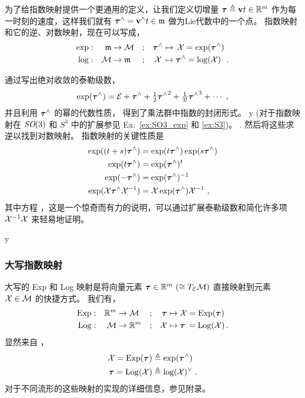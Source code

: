 为了给指数映射提供一个更通用的定义，让我们定义切增量 ${\bm \tau}\triangleq{\bf v} t\in{\mathbb R}^m$ 作为每一时刻的速度，这样我们就有 ${\bm \tau}^\wedge={\bf v}^\wedge t\in\frak{m}$ 做为Lie代数中的一个点。
指数映射和它的逆、对数映射，现在可以写成，
%
\begin{align}
\exp &:& \frak{m} & \to\mathcal{M}      
 &&; & {\bm \tau}^\wedge &\mapsto \,\mathcal{X} = \exp({\bm \tau}^\wedge) 
 \\
\log &:&     \mathcal{M} & \to\frak{m} 
 &&; & \mathcal{X}\,    &\mapsto {\bm \tau}^\wedge = \log(\mathcal{X}) ~
~. 
\end{align}


通过写出绝对收敛的泰勒级数，
%
\begin{align}
\exp({\bm \tau}^\wedge)=\mathcal{E}+{\bm \tau}^\wedge+\tfrac12{{\bm \tau}^\wedge}^2+\tfrac1{3!}{{\bm \tau}^\wedge}^3+\cdots
~,
\end{align}
%
并且利用 ${\bm \tau}^\wedge$ 的幂的代数性质，%
得到了乘法群中指数的封闭形式。
\if \examples y (对于指数映射在 $\textit{SO}(3)$ 和 $S^3$ 中的扩展参见 Ex.~\ref{ex:SO3_exp} 和 \ref{ex:S3})。 \else. \fi
然后将这些求逆以找到对数映射。
%
指数映射的关键性质是 
%
\begin{align}
\exp((t+s){\bm \tau}^\wedge) 
 &= \exp(t{\bm \tau}^\wedge)\exp(s{\bm \tau}^\wedge) \label{equ:prop_exp_ts}
 \\
\exp(t{\bm \tau}^\wedge) 
 &= \exp({\bm \tau}^\wedge)^t \label{equ:prop_exp_t}
 \\
\exp(-{\bm \tau}^\wedge) 
 &= \exp({\bm \tau}^\wedge)^{-1} \label{equ:prop_exp_inv}
 \\
\exp(\mathcal{X}{\bm \tau}^\wedge\mathcal{X}^{-1}) 
 &= \mathcal{X}\exp({\bm \tau}^\wedge)\mathcal{X}^{-1} ~, \label{equ:prop_exp}
\end{align} 
%
其中方程 ，这是一个惊奇而有力的说明，可以通过扩展泰勒级数和简化许多项 $\mathcal{X}^{-1}\mathcal{X}$ 来轻易地证明。

\if\examples y

\fi



\subsubsection[The capitalized Exp map]{大写指数映射}


大写的 Exp 和 Log 映射是将向量元素 ${\bm \tau}\in{\mathbb R}^m~(\cong T_{\mathcal{E}}{\mathcal{M}})$ 直接映射到元素 $\mathcal{X}\in\mathcal{M}$ 的快捷方式。
% 
我们有，
%
\begin{align}
\operatorname*{Exp} &: &{\mathbb R}^m &\to\mathcal{M} &&;&
\,{\bm \tau} &\mapsto \mathcal{X} = \operatorname*{Exp}({\bm \tau})\\
\operatorname*{Log}  &: & \mathcal{M} &\to{\mathbb R}^m &&;&
 \mathcal{X} &\mapsto {\bm \tau}\,=\operatorname*{Log}(\mathcal{X}) 
\,. 
\end{align}
%
显然来自 ，
%
\begin{align}
\mathcal{X}  = \operatorname*{Exp}({\bm \tau}) &\triangleq \exp({\bm \tau}^\wedge) \\
{\bm \tau} =\operatorname*{Log}(\mathcal{X})    &\triangleq \log(\mathcal{X})^\vee 
~. 
\end{align}
%
对于不同流形的这些映射的实现的详细信息，参见附录。


